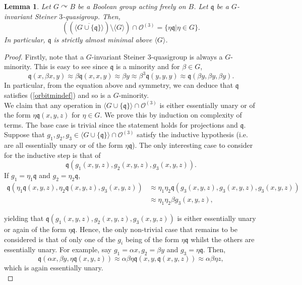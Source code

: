 \documentclass{article}
\newtheorem{lemma}[theorem]{Lemma}
\theoremstyle{remark}
\theoremstyle{definition}
\def\acts{\curvearrowright}
\begin{document}
\begin{lemma}\label{steinsemi} Let $G\acts B$ be a Boolean group acting freely on $B$. Let $\mathfrak{q}$ be a $G$-invariant Steiner $3$-quasigroup. Then, 
\[\left((\overline{\langle G\cup\{\mathfrak{q}\}\rangle})\setminus \langle G\rangle \right)\cap\mathcal{O}^{(3)}=\{\eta \mathfrak{q} \vert \eta\in G\}.\]
In particular, $\mathfrak{q}$ is strictly almost minimal above $\langle G\rangle$.
\end{lemma}
\begin{proof}
Firstly, note that a $G$-invariant Steiner $3$-quasigroup is always a $G$-minority. This is easy to see since $\mathfrak{q}$ is a minority and for $\beta\in G$,
\[\mathfrak{q}(x, \beta x, y)\approx \beta \mathfrak{q}(x,x,y)\approx \beta y\approx \beta^3 \mathfrak{q}(y,y,y)\approx \mathfrak{q}(\beta y,\beta y,\beta y).\]
In particular, from the equation above and symmetry, we can deduce that $\mathfrak{q}$ satisfies (\ref{orbitmindef}) and so is a $G$-minority.\\
We claim that any operation in 
$\langle G\cup\{\mathfrak{q}\}\rangle \cap\mathcal{O}^{(3)}$ is either essentially unary or of the form $\eta \mathfrak{q}(x,y,z)$ for $\eta\in G$. We prove this by induction on complexity of terms. The base case is trivial since the statement holds for projections and $\mathfrak{q}$. Suppose that $g_1, g_2, g_3\in \langle G\cup\{\mathfrak{q}\}\rangle \cap\mathcal{O}^{(3)}$ satisfy the inductive hypothesis (i.e. are all essentially unary or of the form $\eta\mathfrak{q}$). The only interesting case to consider for the inductive step is that of
\[\mathfrak{q}(g_1(x,y,z), g_2(x,y,z), g_3(x,y,z)).\]
If $g_1=\eta_1\mathfrak{q}$ and $g_2=\eta_2\mathfrak{q}$, 
\begin{align*}
    \mathfrak{q}(\eta_1\mathfrak{q}(x,y,z), \eta_2\mathfrak{q}(x,y,z), g_3(x,y,z))& \approx \eta_1\eta_2\mathfrak{q}(g_3(x,y,z), g_3(x,y,z), g_3(x,y,z))\\
    & \approx \eta_1\eta_2\beta g_3(x,y,z),
\end{align*}

yielding that $\mathfrak{q}(g_1(x,y,z), g_2(x,y,z), g_3(x,y,z))$ is either essentially unary or again of the form $\eta\mathfrak{q}$. Hence, the only non-trivial case that remains to be considered is that of only one of the $g_i$ being of the form $\eta\mathfrak{q}$ whilst the others are essentially unary. For example, say $g_1=\alpha x, g_2=\beta y$ and $g_3=\eta\mathfrak{q}$. Then,
\[\mathfrak{q}(\alpha x, \beta y, \eta\mathfrak{q}(x,y,z))\approx \alpha\beta\eta \mathfrak{q}(x,y,\mathfrak{q}(x,y,z))\approx \alpha\beta\eta z,\]
which is again essentially unary.\\


\end{proof}
\end{document}
